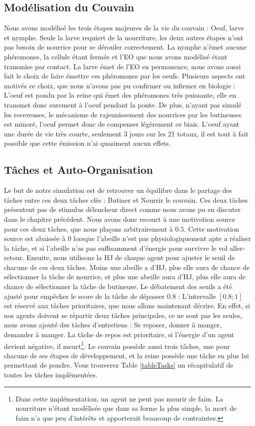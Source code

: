 		
		\subsection{Modélisation du Couvain}
		
			Nous avons modélisé les trois étapes majeures de la vie du couvain : Oeuf, larve et nymphe. Seule la larve requiert de la nourriture, les deux autres étapes n'ont pas besoin de nourrice pour se dérouler correctement. La nymphe n'émet aucune phéromones, la cellule étant fermée et l'EO que nous avons modélisé étant transmise par contact. La larve émet de l'EO en permanence, nous avons aussi fait le choix de faire émettre ces phéromones par les oeufs. Plusieurs aspects ont motivés ce choix, que nous n'avons pas pu confirmer ou infirmer en biologie : L'oeuf est pondu par la reine qui émet des phéromones très puissante, elle en transmet donc surement à l'oeuf pendant la ponte. De plus, n'ayant pas simulé les receveuses, le mécanisme de rajeunissement des nourrices par les butineuses est minoré, l'oeuf permet donc de compenser légèrement ce biais. L'oeuf ayant une durée de vie très courte, seulement 3 jours sur les 21 totaux, il est tout à fait possible que cette émission n'ai quasiment aucun effets.
		
	\subsection{Tâches et Auto-Organisation}
		Le but de notre simulation est de retrouver un équilibre dans le partage des tâches entre ces deux tâches clés : Butiner et Nourrir le couvain. Ces deux tâches présentent pas de stimulus délencheur direct comme nous avons pu en discuter dans le chapitre précédent. Nous avons donc recourt à une motivation source pour ces deux tâches, que nous plaçons arbitrairement à $0.5$. Cette motivation source est abaissée à 0 lorsque l'abeille n'est pas physiologiquement apte a réaliser la tâche, et si l'abeille n'as pas suffisamment d'énergie pour survivre le vol aller-retour. Ensuite, nous utilisons la HJ de chaque agent pour ajuster le seuil de chacune de ces deux tâches. Moins une abeille a d'HJ, plus elle aura de chance de sélectionner la tâche de nourrice, et plus une abeille aura d'HJ, plus elle aura de chance de sélectionner la tâche de butineuse. Le débatement des seuils a été ajusté pour empêcher le score de la tâche de dépasser $0.8$ : L'intervalle $[0.8 ; 1]$ est réservé aux tâches prioritaires, que nous allons maintenant décrire. En effet, si nos agents doivent se répartir deux tâches principales, ce ne sont pas les seules, nous avons ajouté des tâches d'entretiens : Se reposer, donner à manger, demander à manger. La tâche de repos est prioritaire, si l'énergie d'un agent devient négative, il meurt\footnote{Dans cette implémentation, un agent ne peut pas mourir de faim. La nourriture n'étant modélisée que dans sa forme la plus simple, la mort de faim n'a que peu d'intérêts et apporterait beaucoup de contraintes.}. Le couvain possède aussi trois tâches, une pour chacune de ses étapes de développement, et la reine possède une tâche en plus lui permettant de pondre. Vous trouverez Table \ref{tableTasks} un récapitulatif de toutes les tâches implémentées.
		
